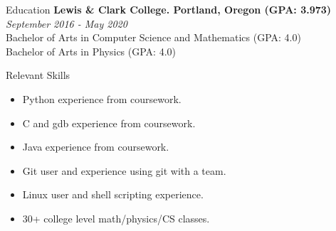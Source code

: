 \documentclass{resume}
\begin{document}
\begin{rSection}{Education}
    \textbf{Lewis \& Clark College. Portland, Oregon (GPA: 3.973)} \hfill \textit{September 2016 - May 2020}\\
    Bachelor of Arts in Computer Science and Mathematics (GPA: 4.0)\\
    Bachelor of Arts in Physics (GPA: 4.0)
\end{rSection}

\begin{rSection}{Relevant Skills}
    \vspace{-3.5mm}
	\begin{multicols}{2}
        \begin{itemize}
        		\item Python experience from coursework.
            \item C and gdb experience from coursework.
            \item Java experience from coursework.
            \item Git user and experience using git with a team.
            \item Linux user and shell scripting experience.
            \item 30+ college level math/physics/CS classes.
        \end{itemize}
    \end{multicols}
      \vspace{-4mm} 
\end{rSection}
\end{document}
